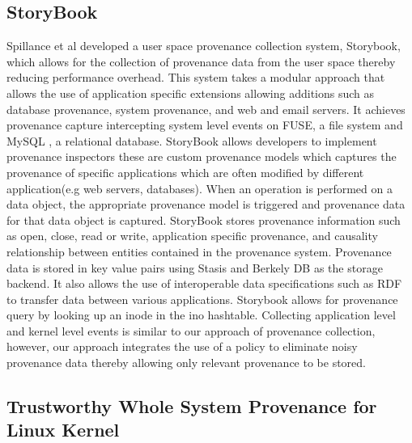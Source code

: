 \subsection{StoryBook}
Spillance et al \cite{story} developed a user space provenance collection system, Storybook, which allows for the collection of provenance data from the user space thereby reducing performance overhead. This system takes a modular approach that allows the use of application specific extensions allowing additions such as database provenance, system provenance, and web and email servers. It achieves provenance capture intercepting system level events on FUSE, a file system and MySQL , a relational database. StoryBook allows developers to implement provenance inspectors these are custom provenance models which captures the provenance of specific applications which are often modified by different application(e.g web servers, databases). When an operation is performed on a data object, the appropriate provenance model is triggered and provenance data for that data object is captured. StoryBook stores provenance information such as open, close, read or write, application specific provenance, and causality relationship between entities contained in the provenance system. Provenance data is stored in key value pairs using Stasis and Berkely DB as the storage backend. It also allows the use of interoperable data specifications such as RDF to transfer data between various applications. Storybook allows for provenance query by looking up an inode in the ino hashtable. Collecting application level and kernel level events is similar to our approach of provenance collection, however, our approach integrates the use of a policy to eliminate noisy provenance data thereby allowing only relevant provenance to be stored.






\subsection{Trustworthy Whole System Provenance for Linux Kernel}

